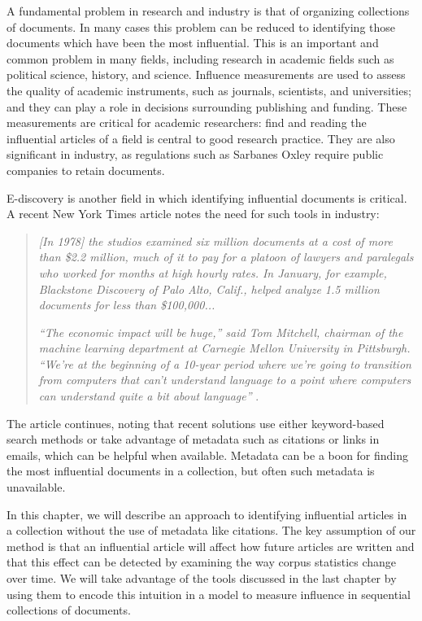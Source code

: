 \label{chapter:influence}

A fundamental problem in research and industry is that of organizing
collections of documents.  In many cases this problem can be reduced
to identifying those documents which have been the most influential.
This is an important and common problem in many fields, including
research in academic fields such as political science, history, and
science.  Influence measurements are used to assess the quality of
academic instruments, such as journals, scientists, and universities;
and they can play a role in decisions surrounding publishing and
funding. These measurements are critical for academic researchers:
find and reading the influential articles of a field is central to
good research practice.  They are also significant in industry, as
regulations such as Sarbanes Oxley require public companies to retain
documents.

E-discovery is another field in which identifying influential
documents is critical.  A recent New York Times article notes the
need for such tools in industry:
\begin{quote}
  \emph{[In 1978] the studios examined six million documents at a
    cost of more than \$2.2 million, much of it to pay for a platoon
    of lawyers and paralegals who worked for months at high hourly
    rates.  In January, for example, Blackstone Discovery of Palo
    Alto, Calif., helped analyze 1.5 million documents for less than
    \$100,000...}

  \emph{``The economic impact will be huge,'' said Tom Mitchell, chairman
    of the machine learning department at Carnegie Mellon University
    in Pittsburgh. ``We’re at the beginning of a 10-year period where
    we’re going to transition from computers that can’t understand
    language to a point where computers can understand quite a bit
    about language''} \citep{markoff:2011}.
\end{quote}

The article continues, noting that recent solutions use either
keyword-based search methods or take advantage of metadata such as
citations or links in emails, which can be helpful when available.
Metadata can be a boon for finding the most influential documents in a
collection, but often such metadata is unavailable.

In this chapter, we will describe an approach to identifying
influential articles in a collection without the use of metadata like
citations.  The key assumption of our method is that an influential
article will affect how future articles are written and that this
effect can be detected by examining the way corpus statistics change
over time.  We will take advantage of the tools discussed in the last
chapter by using them to encode this intuition in a model to measure
influence in sequential collections of documents.

